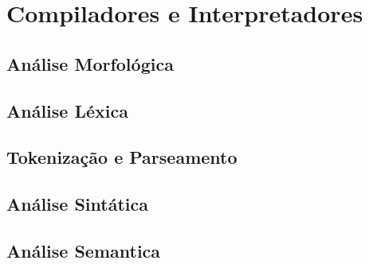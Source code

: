 \section{Compiladores e Interpretadores}

\subsection{Análise Morfológica}

\subsection{Análise Léxica}

\subsection{Tokenização e Parseamento}

\subsection{Análise Sintática}

\subsection{Análise Semantica}
